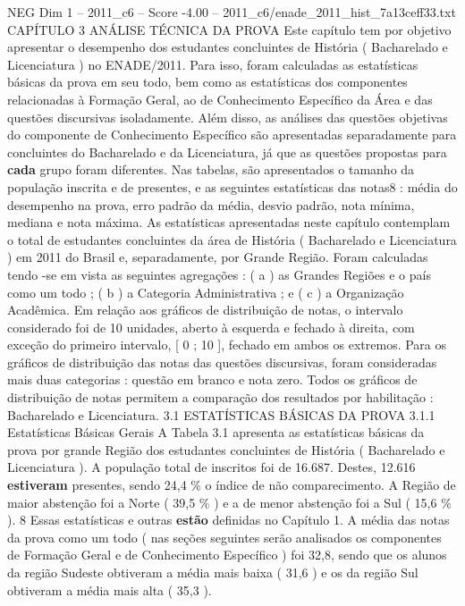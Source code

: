 \begin{textsample}{NEG Dim 1 – 2011\_c6 – Score -4.00 – 2011\_c6/enade\_2011\_hist\_7a13ceff33.txt}  \label{ex:f1_neg_224}
CAPÍTULO 3 ANÁLISE TÉCNICA DA PROVA Este capítulo tem por objetivo apresentar o desempenho dos estudantes concluintes de História ( Bacharelado e Licenciatura ) no ENADE/2011.
Para isso, foram calculadas as estatísticas básicas da prova em seu todo, bem como as estatísticas dos componentes relacionadas à Formação Geral, ao de Conhecimento Específico da Área e das questões discursivas isoladamente.
Além disso, as análises das questões objetivas do componente de Conhecimento Específico são apresentadas separadamente para concluintes do Bacharelado e da Licenciatura, já que as questões propostas para \textbf{cada} grupo foram diferentes.
Nas tabelas, são apresentados o tamanho da população inscrita e de presentes, e as seguintes estatísticas das notas8 : média do desempenho na prova, erro padrão da média, desvio padrão, nota mínima, mediana e nota máxima.
As estatísticas apresentadas neste capítulo contemplam o total de estudantes concluintes da área de História ( Bacharelado e Licenciatura ) em 2011 do Brasil e, separadamente, por Grande Região.
Foram calculadas tendo -se em vista as seguintes agregações : ( a ) as Grandes Regiões e o país como um todo ; ( b ) a Categoria Administrativa ; e ( c ) a Organização Acadêmica.
Em relação aos gráficos de distribuição de notas, o intervalo considerado foi de 10 unidades, aberto à esquerda e fechado à direita, com exceção do primeiro intervalo, [ 0 ; 10 ], fechado em ambos os extremos.
Para os gráficos de distribuição das notas das questões discursivas, foram consideradas mais duas categorias : questão em branco e nota zero.
Todos os gráficos de distribuição de notas permitem a comparação dos resultados por habilitação : Bacharelado e Licenciatura. 3.1 ESTATÍSTICAS BÁSICAS DA PROVA 3.1.1 Estatísticas Básicas Gerais A Tabela 3.1 apresenta as estatísticas básicas da prova por grande Região dos estudantes concluintes de História ( Bacharelado e Licenciatura ).
A população total de inscritos foi de 16.687.
Destes, 12.616 \textbf{estiveram} presentes, sendo 24,4 \% o índice de não comparecimento.
A Região de maior abstenção foi a Norte ( 39,5 \% ) e a de menor abstenção foi a Sul ( 15,6 \% ). 8 Essas estatísticas e outras \textbf{estão} definidas no Capítulo 1.
A média das notas da prova como um todo ( nas seções seguintes serão analisados os componentes de Formação Geral e de Conhecimento Específico ) foi 32,8, sendo que os alunos da região Sudeste obtiveram a média mais baixa ( 31,6 ) e os da região Sul obtiveram a média mais alta ( 35,3 ).

\end{textsample}
